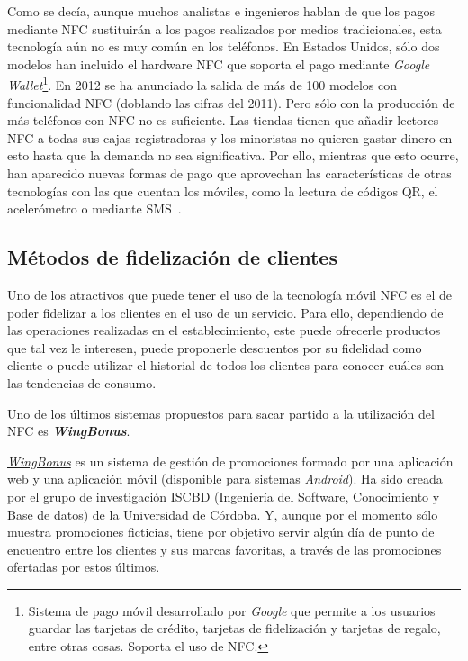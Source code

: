   Como se decía, aunque muchos analistas e ingenieros hablan de que los 
  pagos mediante \acs{NFC} sustituirán a los pagos realizados por medios
  tradicionales, esta tecnología aún no es muy común en los teléfonos. En
  Estados Unidos, sólo dos modelos han incluido el hardware \acs{NFC}
  que soporta el pago mediante \emph{Google Wallet}\footnote{Sistema de pago 
  móvil desarrollado por \emph{Google} que permite a los usuarios guardar las 
  tarjetas de crédito, tarjetas de fidelización y tarjetas de regalo, entre 
  otras cosas. Soporta el uso de \acs{NFC}.}. En 2012 se ha anunciado
  la salida de más de 100 modelos con funcionalidad \acs{NFC} (doblando las 
  cifras del 2011). Pero sólo con la producción de más teléfonos con \acs{NFC} 
  no es suficiente. Las tiendas tienen que añadir lectores \acs{NFC} a todas
  sus cajas registradoras y los minoristas no quieren gastar dinero en esto
  hasta que la demanda no sea significativa. Por ello, mientras que esto 
  ocurre, han aparecido nuevas formas de pago que aprovechan las 
  características de otras tecnologías con las que cuentan los móviles, como 
  la lectura de códigos \acs{QR}, el acelerómetro o mediante
  \acs{SMS}~\cite{bib:noWaiting}.

    \subsection{Métodos de fidelización de clientes}
  Uno de los atractivos que puede tener el uso de la tecnología móvil \acs{NFC}
  es el de poder fidelizar a los clientes en el uso de un servicio. Para ello,
  dependiendo de las operaciones realizadas en el
  establecimiento, este puede ofrecerle productos que tal vez le interesen,
  puede proponerle descuentos por su fidelidad como cliente o puede utilizar
  el historial de todos los clientes para conocer cuáles son las tendencias
  de consumo.
  
  Uno de los últimos sistemas propuestos para sacar 
  partido a la utilización del \acs{NFC} es \emph{\textbf{WingBonus}}.

  \emph{\href{http://wingbonus.com/}{WingBonus}} es un sistema de
  gestión de promociones formado por una aplicación web y una aplicación móvil
  (disponible para sistemas \emph{Android}). Ha sido creada por el grupo de 
  investigación ISCBD (Ingeniería del Software, Conocimiento y Base de datos) 
  de la Universidad de Córdoba. Y, aunque por el momento sólo muestra 
  promociones ficticias, tiene por objetivo servir algún día de punto de 
  encuentro entre los clientes y sus marcas favoritas, a través de las 
  promociones ofertadas por estos últimos.
  
